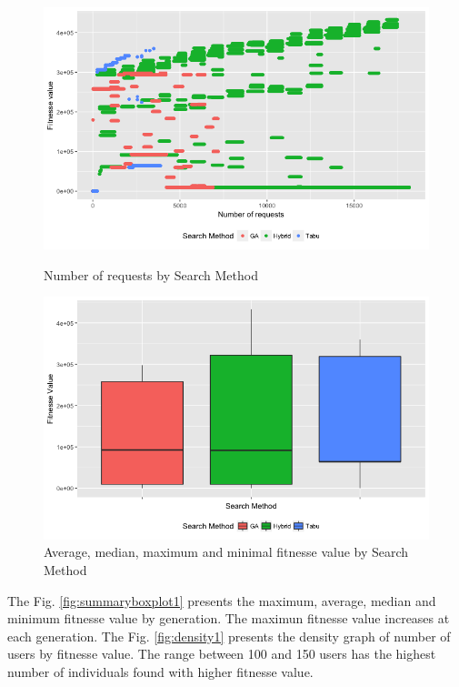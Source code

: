 \documentclass[times]{stvrauth}
\begin{document}
\begin{figure}[h]
\begin{minipage}{.5\textwidth}
\centering
\includegraphics[width=1\textwidth]{./images/experiment1-3.png}
\caption{Number of requests by Search Method}
\label{fig:numberofrequestsbysearchmethod}
\end{minipage}
\begin{minipage}{.5\textwidth}
\centering
\includegraphics[width=1\textwidth]{./images/experiment1-4.png}
\caption{Average, median, maximum and minimal fitnesse value by Search Method}
\label{fig:boxplot1}
\end{minipage}
\end{figure}

The Fig. \ref{fig:summaryboxplot1} presents the maximum, average, median and minimum fitnesse value by generation. The maximun fitnesse value increases at each generation. The Fig. \ref{fig:density1} presents the density graph of number of users by fitnesse value. The range between 100 and 150 users has the highest number of individuals found with higher fitnesse value.
\end{document}
